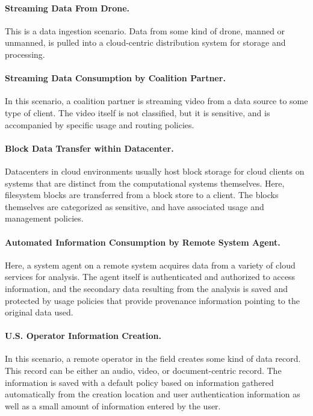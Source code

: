 \documentclass[10pt,letterpaper]{article}
\begin{document}
\paragraph{Streaming Data From Drone.} This is a data ingestion scenario.  Data from some kind of drone, manned or unmanned, is pulled into a cloud-centric distribution system for storage and processing.

\paragraph{Streaming Data Consumption by Coalition Partner.} In this scenario, a coalition partner is streaming video from a data source to some type of client. The video itself is not classified, but it is sensitive, and is accompanied by specific usage and routing policies.

\paragraph{Block Data Transfer within Datacenter.} Datacenters in cloud environments usually host block storage for cloud clients on systems that are distinct from the computational systems themselves.  Here, filesystem blocks are transferred from a block store to a client.  The blocks themselves are categorized as sensitive, and have associated usage and management policies.

\paragraph{Automated Information Consumption by Remote System Agent.} Here, a system agent on a remote system acquires data from a variety of cloud services for analysis.  The agent itself is authenticated and authorized to access information, and the secondary data resulting from the analysis is saved and protected by usage policies that provide provenance information pointing to the original data used.

\paragraph{U.S. Operator Information Creation.} In this scenario, a remote operator in the field creates some kind of data record.  This record can be either an audio, video, or document-centric record.  The information is saved with a default policy based on information gathered automatically from the creation location and user authentication information as well as a small amount of information entered by the user.
\end{document}
